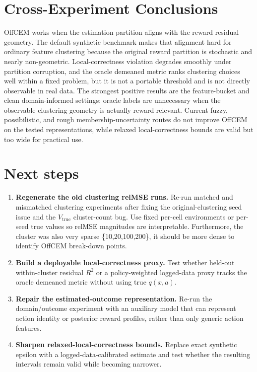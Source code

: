 \documentclass[11pt]{article}
\begin{document}
\section{Cross-Experiment Conclusions}
OffCEM works when the estimation partition aligns with the reward residual geometry. The default synthetic benchmark makes that alignment hard for ordinary feature clustering because the original reward partition is stochastic and nearly non-geometric. Local-correctness violation degrades smoothly under partition corruption, and the oracle demeaned metric ranks clustering choices well within a fixed problem, but it is not a portable threshold and is not directly observable in real data. The strongest positive results are the feature-bucket and clean domain-informed settings: oracle labels are unnecessary when the observable clustering geometry is actually reward-relevant. Current fuzzy, possibilistic, and rough membership-uncertainty routes do not improve OffCEM on the tested representations, while relaxed local-correctness bounds are valid but too wide for practical use.

\section{Next steps}

\begin{enumerate}
  \item \textbf{Regenerate the old clustering relMSE runs.} Re-run matched and mismatched clustering experiments after fixing the original-clustering seed issue and the $V_{\mathrm{true}}$ cluster-count bug. Use fixed per-cell environments or per-seed true values so relMSE magnitudes are interpretable. Furthermore, the cluster was also very sparse \{10,20,100,200\}, it should be more dense to identify OffCEM break-down points.
  \item \textbf{Build a deployable local-correctness proxy.} Test whether held-out within-cluster residual $R^2$ or a policy-weighted logged-data proxy tracks the oracle demeaned metric without using true $q(x,a)$.
  \item \textbf{Repair the estimated-outcome representation.} Re-run the domain/outcome experiment with an auxiliary model that can represent action identity or posterior reward profiles, rather than only generic action features.
  \item \textbf{Sharpen relaxed-local-correctness bounds.} Replace exact synthetic epsilon with a logged-data-calibrated estimate and test whether the resulting intervals remain valid while becoming narrower.
\end{enumerate}
\end{document}
